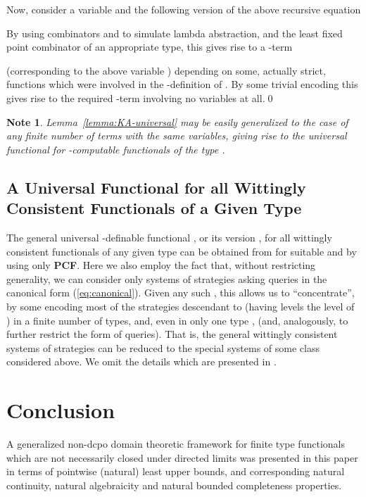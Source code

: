 \documentclass[fleqn]{LMCS}
\theoremstyle{plain}\newtheorem{satz}[thm]{Satz}
\theoremstyle{plain}\newtheorem{hyp}[thm]{Hypothesis}
\theoremstyle{plain}\newtheorem{hyps}[thm]{Hypotheses}
\theoremstyle{definition}\newtheorem{note}[thm]{Note}
\newcommand{\PCF}{\mbox{\bf PCF}}
\newcommand{\?}{\mbox{?}}
\begin{document}
Now, consider a variable  and the following 
version of the above recursive equation 

By using combinators  and  to simulate lambda abstraction, and 
the least fixed point combinator  of an appropriate type, 
this gives rise to a -term 
 
(corresponding to the above variable )
depending on some, actually strict, functions  which 
were involved in the -definition of . 
By some trivial encoding this gives rise to the required 
-term  
involving no variables  at all.\qed


\begin{note}\em
Lemma~\ref{lemma:KA-universal} may be easily generalized to the case 
of any finite number of terms  
with the same variables, giving rise to the universal functional 
 for -computable functionals 
of the type  . 
\end{note}


\subsection{A Universal Functional for all Wittingly Consistent 
Functionals of a Given Type}
\label{sec:univ-wittingly-consis}

\noindent
The general universal -definable functional 
, or its version 
, for all wittingly consistent 
functionals of any given type 
can be obtained from  for suitable  
and  by using only \PCF. 
Here we also employ the fact that, without restricting generality, 
we can consider only systems of strategies  asking queries 
in the canonical form (\ref{eq:canonical}). 
Given any such , this allows us to ``concentrate'', by some encoding 
most of the strategies descendant to  
(having levels  the level of ) 
in a finite number of types, and, even in only one type , 
(and, analogously, to further restrict 
the form of queries). That is, the general wittingly 
consistent systems of strategies can be 
reduced to the special systems of some class  considered above. 
We omit the details which are presented in \cite{Saz76AL}. 



\section{Conclusion}
\label{sec:conclusion}

\noindent
A generalized non-dcpo domain theoretic framework for finite type functionals 
which are not necessarily closed under directed limits was presented in this paper 
in terms of pointwise (natural) least upper bounds, and corresponding 
natural continuity, natural algebraicity and natural bounded completeness 
properties. 
\end{document}
